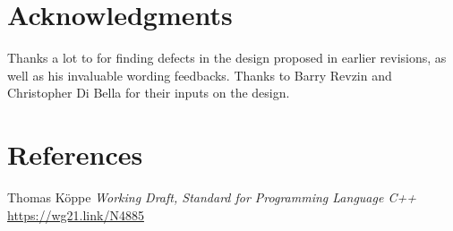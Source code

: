 \documentclass{wg21}
\begin{document}
\section{Acknowledgments}

Thanks a lot to  for finding defects in the design proposed in earlier revisions, as well as his invaluable wording feedbacks.
Thanks to Barry Revzin and Christopher Di Bella for their inputs on the design.

\section{References}
\renewcommand{\section}[2]{}%



\begin{thebibliography}{9}

Thomas Köppe
\emph{Working Draft, Standard for Programming Language C++}\newline
\url{https://wg21.link/N4885}


\end{thebibliography}
\end{document}
